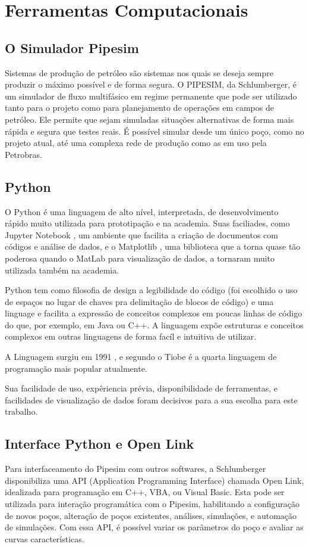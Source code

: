 
\chapter{Ferramentas Computacionais} \label{chap:4}


\section{O Simulador Pipesim}
Sistemas de produção de petróleo são sistemas nos quais se deseja sempre produzir o máximo possível e de forma segura.
O PIPESIM, da Schlumberger, é um simulador de fluxo multifásico em regime permanente que pode ser utilizado tanto para o projeto como para planejamento de operações em campos de petróleo. Ele permite que sejam simuladas situações alternativas de forma mais rápida e segura que testes reais. É possível simular desde um único poço, como no projeto atual, até uma complexa rede de produção como as em uso pela Petrobras.

\section{Python}

O Python é uma linguagem de alto nível, interpretada, de desenvolvimento rápido muito utilizada para prototipação e na academia. Suas faciliades, como Jupyter Notebook \cite{jupyter}, um ambiente que facilita a criação de documentos com códigos e análise de dados, e o Matplotlib \cite{matplotlib}, uma biblioteca que a torna quase tão poderosa quando o MatLab para visualização de dados, a tornaram muito utilizada também na academia.

Python tem como filosofia de design a legibilidade do código (foi escolhido o uso de espaços no lugar de chaves pra delimitação de blocos de código) e uma linguage e facilita a expressão de conceitos complexos em poucas linhas de código do que, por exemplo, em Java ou C++. A linguagem expõe estruturas e conceitos complexos em outras linguagens de forma facíl e intuitiva de utilizar.

A Linguagem surgiu em 1991 \cite{pythonHistory}, e segundo o Tiobe \cite{tiobe} é a quarta linguagem de programação mais popular atualmente.

Sua facilidade de uso, expêriencia prévia, disponibilidade de ferramentas, e facilidades de visualização de dados foram decisivos para a sua escolha para este trabalho. 

\section{Interface Python e Open Link}
Para interfaceamento do Pipesim com outros softwares, a Schlumberger disponibiliza uma API (Application Programming Interface) chamada Open Link, idealizada para programação em C++, VBA, ou Visual Basic. Esta pode ser utilizada para interação programática com o Pipesim, habilitando a configuração de novos poços, alteração de poços existentes, análises, simulações, e automação de simulações. Com essa API, é possível variar os parâmetros do poço e avaliar as curvas características.




